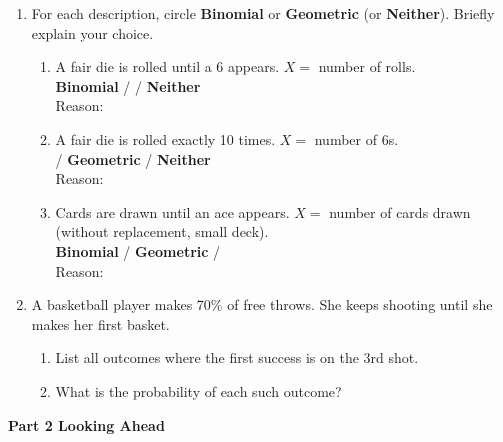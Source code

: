 \documentclass[10pt]{article}
\begin{document}
\begin{enumerate}
    \item For each description, circle \textbf{Binomial} or \textbf{Geometric} (or
    \textbf{Neither}). Briefly explain your choice.
    \begin{enumerate}[label=(\alph*), itemsep=2pt]
        \item A fair die is rolled until a 6 appears. $X =$ number of rolls.\\
              \textbf{Binomial} \quad / \quad {} \quad / \quad \textbf{Neither}\\
              Reason: 
        \item A fair die is rolled exactly 10 times. $X =$ number of 6s.\\
               \quad / \quad \textbf{Geometric} \quad / \quad \textbf{Neither}\\
              Reason: 
        \item Cards are drawn until an ace appears. $X =$ number of cards drawn
              (without replacement, small deck).\\
              \textbf{Binomial} \quad / \quad \textbf{Geometric} \quad / \quad {}\\
              Reason: 
    \end{enumerate}

    \vspace{0.06in}

    \item A basketball player makes 70\% of free throws. She keeps shooting until
    she makes her first basket.
    \begin{enumerate}[label=(\alph*), itemsep=2pt]
        \item List all outcomes where the first success is on the 3rd shot.\\
        \item What is the probability of each such outcome?\\
    \end{enumerate}

\end{enumerate}

\vspace{0.05in}

{\large\bfseries\color{navy} Part 2 \quad Looking Ahead}
\end{document}
